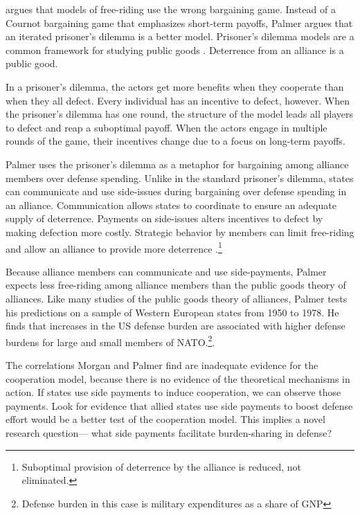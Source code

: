 \documentclass[12pt]{article}
\begin{document}
\citet{Palmer1990} argues that models of free-riding use the wrong bargaining game. 
Instead of a Cournot bargaining game that emphasizes short-term payoffs, Palmer argues that an iterated prisoner's dilemma is a better model. 
Prisoner's dilemma models are a common framework for studying public goods \citep{Axelrod1984}.
Deterrence from an alliance is a public good. 

In a prisoner's dilemma, the actors get more benefits when they cooperate than when they all defect. 
Every individual has an incentive to defect, however. 
When the prisoner's dilemma has one round, the structure of the model leads all players to defect and reap a suboptimal payoff. 
When the actors engage in multiple rounds of the game, their incentives change due to a focus on long-term payoffs.


Palmer uses the prisoner's dilemma as a metaphor for bargaining among alliance members over defense spending. 
Unlike in the standard prisoner's dilemma, states can communicate and use side-issues during bargaining over defense spending in an alliance.
Communication allows states to coordinate to ensure an adequate supply of deterrence. 
Payments on side-issues alters incentives to defect by making defection more costly. 
Strategic behavior by members can limit free-riding and allow an alliance to provide more deterrence \cite{Hardin1982}.\footnote{Suboptimal provision of deterrence by the alliance is reduced, not eliminated.} 


Because alliance members can communicate and use side-payments, Palmer expects less free-riding among alliance members than the public goods theory of alliances.  
Like many studies of the public goods theory of alliances, Palmer tests his predictions on a sample of Western European states from 1950 to 1978. 
He finds that increases in the US defense burden are associated with higher defense burdens for large and small members of NATO.\footnote{Defense burden in this case is military expenditures as a share of GNP}.  


The correlations Morgan and Palmer find are inadequate evidence for the cooperation model, because there is no evidence of the theoretical mechanisms in action. 
If states use side payments to induce cooperation, we can observe those payments. 
Look for evidence that allied states use side payments to boost defense effort would be a better test of the cooperation model. 
This implies a novel research question--- what side payments facilitate burden-sharing in defense? 
\end{document}
